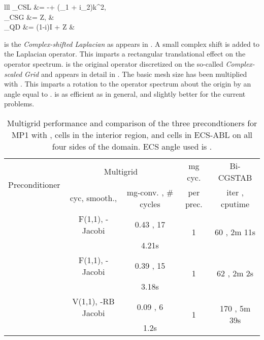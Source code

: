 \documentclass[mathpazo]{cicp}
\theoremstyle{definition}
\numberwithin{equation}{section}
\providecommand{\hbz}{}
\begin{document}
\begin{algorithm}
\begin{enumerate}
\begin{tabular}{lll}
 _{CSL} &= -\Delta + (\beta_1 + i\beta_2)k^2,\\
 _{CSG} &= Z, & {\scriptstyle {}}\\
 _{QD} &= (1-i)I + Z & {\scriptstyle {}}


\hbz{ is the \textit{Complex-shifted Laplacian} as appears in \cite{Yogi06}. A small complex shift is added to the Laplacian operator. This imparts a rectangular translational effect on the operator spectrum.  is the original operator discretized on the so-called \textit{Complex-scaled Grid} and appears in detail in \cite{reps2009}. The basic mesh size has been multiplied with . This imparts a rotation to the operator spectrum about the origin by an angle equal to .  is as efficient as  in general, and slightly better for the current problems. }

\begin{table}
 \begin{tabular}{|c|c|c|c|c|} \hline 
  \multirow{2}{*}{Preconditioner} & \multicolumn{2}{c|}{Multigrid} & mg cyc. & Bi-CGSTAB\\ \cline{2-3}
 & cyc, smooth.,  & mg-conv. , \# cycles & per prec. & iter , cputime \\ \hline
 & F(1,1), -Jacobi & 0.43 , 17 & \multirow{2}{*}{1} & \multirow{2}{*}{60 , 2m 11s}\\
 &  & 4.21s & & \\ \hline
 & F(1,1), -Jacobi & 0.39 , 15 & \multirow{2}{*}{1} & \multirow{2}{*}{62 , 2m 2s}\\
 &  & 3.18s & & \\ \hline
 & V(1,1), -RB Jacobi & 0.09 , 6 & \multirow{2}{*}{1} & \multirow{2}{*}{170 , 5m 39s}\\
 &  & 1.2s & & \\ \hline
 \end{tabular}
\caption{Multigrid performance and comparison of the three precondtioners for MP1 with ,  cells in the interior region, and  cells in ECS-ABL on all four sides of the domain. ECS angle used is .}
\label{tab:exp1}
\end{table}


\end{tabular}
\end{enumerate}
\end{algorithm}
\end{document}
